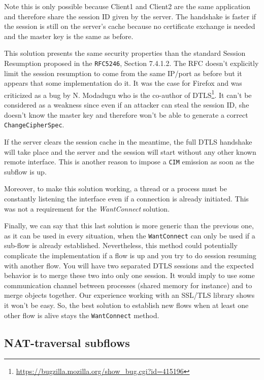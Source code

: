 Note this is only possible because Client1 and Client2 are the same application and therefore share the session ID given by the server. The handshake is faster if the session is still on the server's cache because no certificate exchange is needed and the master key is the same as before.

This solution presents the same security properties than the standard Session Resumption proposed in the \texttt{RFC5246}\cite{rfc5246}, Section 7.4.1.2. The RFC doesn't explicitly limit the session resumption to come from the same IP/port as before but it appears that some implementation do it. It was the case for Firefox and was criticized as a bug by N. Modadugu who is the co-author of DTLS\footnote{\url{https://bugzilla.mozilla.org/show_bug.cgi?id=415196}}. It can't be considered as a weakness since even if an attacker can steal the session ID, she doesn't know the master key and therefore won't be able to generate a correct \texttt{ChangeCipherSpec}.

If the server clears the session cache in the meantime, the full DTLS handshake will take place and the server and the session will start without any other known remote interface. This is another reason to impose a \texttt{CIM} emission as soon as the subflow is up.

Moreover, to make this solution working, a thread or a process must be constantly listening the interface even if a connection is already initiated. This was not a requirement for the \textit{WantConnect} solution.

Finally, we can say that this last solution is more generic than the previous one, as it can be used in every situation, when the \texttt{WantConnect} can only be used if a sub-flow is already established. Nevertheless, this method could potentially complicate the implementation if a flow is up and you try to do session resuming with another flow. You will have two separated DTLS sessions and the expected behavior is to merge these two into only one session. It would imply to use some communication channel between processes (shared memory for instance) and to merge objects together. Our experience working with an SSL/TLS library shows it won't be easy. So, the best solution to establish new flows when at least one other flow is alive stays the \texttt{WantConnect} method.

\subsection{NAT-traversal subflows}

